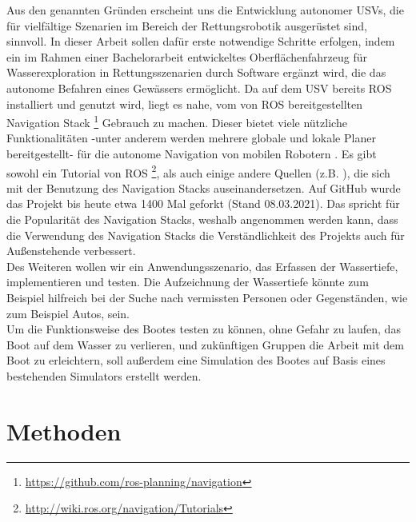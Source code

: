 \documentclass[11pt]{article}
\begin{document}
Aus den genannten Gründen erscheint uns die Entwicklung autonomer USVs, die für vielfältige Szenarien im Bereich der Rettungsrobotik ausgerüstet sind, sinnvoll. In dieser Arbeit sollen dafür erste notwendige Schritte erfolgen, indem ein im Rahmen einer Bachelorarbeit entwickeltes Oberflächenfahrzeug für Wasserexploration in Rettungsszenarien durch Software ergänzt wird, die das autonome Befahren eines Gewässers ermöglicht. Da auf dem USV bereits ROS installiert und genutzt wird, liegt es nahe, vom von ROS bereitgestellten Navigation Stack \footnote{\url{https://github.com/ros-planning/navigation}} Gebrauch zu machen. Dieser bietet viele nützliche Funktionalitäten -unter anderem werden mehrere globale und lokale Planer bereitgestellt- für die autonome Navigation von mobilen Robotern \cite{zheng2019ros}. Es gibt sowohl ein Tutorial von ROS \footnote{\url{http://wiki.ros.org/navigation/Tutorials}}, als auch einige andere Quellen (z.B. \cite{zheng2019ros}), die sich mit der Benutzung des Navigation Stacks auseinandersetzen. Auf GitHub wurde das Projekt bis heute etwa 1400 Mal geforkt (Stand 08.03.2021). Das spricht für die Popularität des Navigation Stacks, weshalb angenommen werden kann, dass die Verwendung des Navigation Stacks die Verständlichkeit des Projekts auch für Außenstehende verbessert.\\

Des Weiteren wollen wir ein Anwendungsszenario, das Erfassen der Wassertiefe, implementieren und testen. Die Aufzeichnung der Wassertiefe könnte zum Beispiel hilfreich bei der Suche nach vermissten Personen oder Gegenständen, wie zum Beispiel Autos, sein.\\

Um die Funktionsweise des Bootes testen zu können, ohne Gefahr zu laufen, das Boot auf dem Wasser zu verlieren, und zukünftigen Gruppen die Arbeit mit dem Boot zu erleichtern, soll außerdem eine Simulation des Bootes auf Basis eines bestehenden Simulators erstellt werden.

\section{Methoden}
\end{document}
